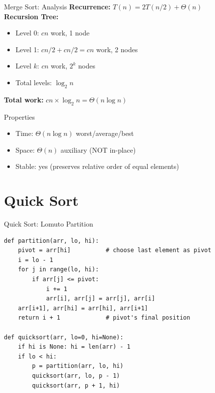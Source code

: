 \documentclass[aspectratio=169,xcolor=dvipsnames]{beamer}
\begin{document}
\begin{frame}{Merge Sort: Analysis}
  \textbf{Recurrence:} $T(n) = 2T(n/2) + \Theta(n)$\\[6pt]
  \textbf{Recursion Tree:}
  \begin{itemize}
    \item Level 0: $cn$ work, 1 node
    \item Level 1: $cn/2 + cn/2 = cn$ work, 2 nodes
    \item Level $k$: $cn$ work, $2^k$ nodes
    \item Total levels: $\log_2 n$
  \end{itemize}
  \textbf{Total work:} $cn \times \log_2 n = \Theta(n\log n)$\\[6pt]
  \begin{block}{Properties}
    \begin{itemize}
      \item Time: $\Theta(n\log n)$ worst/average/best
      \item Space: $\Theta(n)$ auxiliary (NOT in-place)
      \item Stable: yes (preserves relative order of equal elements)
    \end{itemize}
  \end{block}
\end{frame}

\section{Quick Sort}
\begin{frame}[fragile]{Quick Sort: Lomuto Partition}
  \begin{lstlisting}
def partition(arr, lo, hi):
    pivot = arr[hi]          # choose last element as pivot
    i = lo - 1
    for j in range(lo, hi):
        if arr[j] <= pivot:
            i += 1
            arr[i], arr[j] = arr[j], arr[i]
    arr[i+1], arr[hi] = arr[hi], arr[i+1]
    return i + 1             # pivot's final position

def quicksort(arr, lo=0, hi=None):
    if hi is None: hi = len(arr) - 1
    if lo < hi:
        p = partition(arr, lo, hi)
        quicksort(arr, lo, p - 1)
        quicksort(arr, p + 1, hi)
  \end{lstlisting}
\end{frame}
\end{document}
